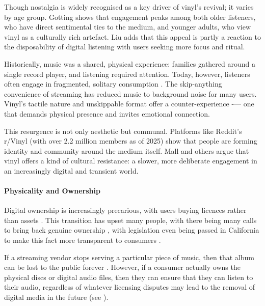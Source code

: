                 Though nostalgia is widely recognised as a key driver of vinyl’s revival; it varies by age group. Gotting \cite{Gotting2021} shows that engagement peaks among both older listeners, who have direct sentimental ties to the medium, and younger adults, who view vinyl as a culturally rich artefact. Liu \cite{Liu2020} adds that this appeal is partly a reaction to the disposability of digital listening with users seeking more focus and ritual.
    
                Historically, music was a shared, physical experience: families gathered around a single record player, and listening required attention. Today, however, listeners often engage in fragmented, solitary consumption \cite{historyandrevivalofvinyls}. The skip-anything convenience of streaming has reduced music to background noise for many users. Vinyl’s tactile nature and unskippable format offer a counter-experience -— one that demands physical presence and invites emotional connection.
    
                This resurgence is not only aesthetic but communal. Platforms like Reddit’s r/Vinyl (with over 2.2 million members as of 2025) show that people are forming identity and community around the medium itself. Mall \cite{vinylRevival} and others argue that vinyl offers a kind of cultural resistance: a slower, more deliberate engagement in an increasingly digital and transient world.
          
            \paragraph{Physicality and Ownership} %
    
                Digital ownership is increasingly precarious, with users buying licences rather than assets \cite{verge2024steam_license}. This transition has upset many people, with there being many calls to bring back genuine ownership \cite{stanton2024gamers_pushback}, with legislation even being passed in California to make this fact more transparent to consumers \cite{california2024ab2426}.
    
                If a streaming vendor stops serving a particular piece of music, then that album can be lost to the public forever \cite{polygon2024cartoon_network_delisting}. However, if a consumer actually owns the physical discs or digital audio files, then they can ensure that they can listen to their audio, regardless of whatever licensing disputes may lead to the removal of digital media in the future (see \cite{bains2022lotr_strategy}).
    
